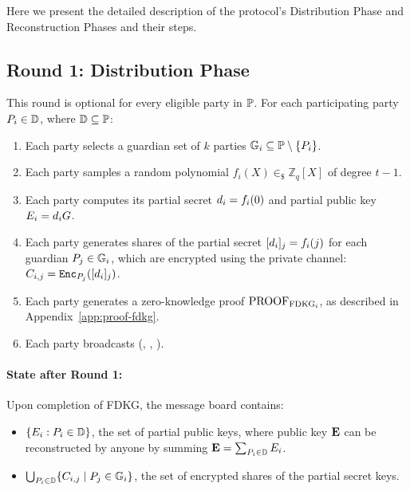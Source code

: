 \documentclass[lettersize,journal]{IEEEtran}
\theoremstyle{definition}
\begin{document}
Here we present the detailed description of the protocol's Distribution Phase and Reconstruction Phases and their steps.
\subsection{Round 1: Distribution Phase}

This round is optional for every eligible party in $\mathbb{P}{}$. For each participating party $P_{i} \in \mathbb{D}$, where $\mathbb{D} \subseteq \mathbb{P}$:
\begin{enumerate}
    \item Each party selects a guardian set of $k$ parties $\mathbb{G}_{i} \subseteq \mathbb{P} \setminus \{P_{i}\}$.

    \item Each party samples a random polynomial $f_{i}(X) \in_{\$} \mathbb{Z}_q[X]$ of degree $t-1$.
    
    \item  Each party computes its partial secret $d_{i}= f_i(0)$ and partial public key $E_{i} = d_{i} G$.
    
    \item  Each party generates shares of the partial secret $[d_{i}]_{j}=f_i(j)$ for each guardian $P_{j} \in \mathbb{G}_{i}$, which are encrypted using the private channel: $C_{i,j}=\texttt{Enc}_{P_{j}}([d_{i}]_{j})$.
    
    \item Each party generates a zero-knowledge proof $\textrm{PROOF}_{\textrm{FDKG}_{i}}$, as described in Appendix~\ref{app:proof-fdkg}.
    
    \item Each party broadcasts (, , ).
\end{enumerate}

\paragraph*{State after Round 1:}
Upon completion of FDKG, the message board contains:
\begin{itemize}
    \item $\{E_{i} : P_{i} \in \mathbb{D}\}$, the set of partial public keys, where public key $\textbf{E}$ can be reconstructed by anyone by summing $\textbf{E}=\sum_{P_{i} \in \mathbb{D}} E_{i}$.
    \item $\bigcup_{P_{i} \in \mathbb{D}} \{C_{i,j} \mid P_j \in \mathbb{G}_i\}$, the set of encrypted shares of the partial secret keys.
\end{itemize}
\end{document}
